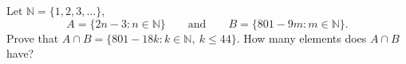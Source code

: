 Let $\mathbb N=\{1,2,3,\dots\}$,
\[A=\{2n-3:n\in\mathbb N\}\qquad\text{and}\qquad B=\{801-9m:m\in\mathbb N\}.\]
Prove that $A\cap B=\{801-18k:k\in\mathbb N,\ k\le44\}$. How many elements does $A\cap B$ have?
